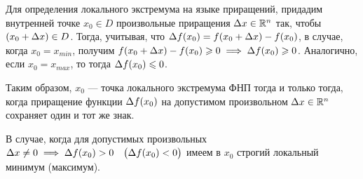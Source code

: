 \documentclass[../../main.tex]{subfiles}
\begin{document}
	Для определения локального экстремума на языке приращений,
	придадим внутренней точке $x_0 \in D$
	произвольные приращения $\Delta x \in \mathbb{R}^n$ так,
	чтобы $(x_0 + \Delta x) \in D$.
	Тогда, учитывая, что $\Delta f (x_0)
	= f (x_0 + \Delta x) - f (x_0)$,
	в случае, когда $x_0 = x_{min}$, получим
	$f (x_0 + \Delta x) - f (x_0) \geqslant 0
	\implies
	\Delta f (x_0) \geqslant 0$.
	Аналогично, если $x_0 = x_{max}$,
	то тогда $\Delta f (x_0) \leqslant 0$.

	Таким образом, $x_0$ --- точка локального экстремума ФНП
	тогда и только тогда, когда
	приращение функции $\Delta f (x_0)$ на допустимом
	произвольном $\Delta x \in \mathbb{R}^n$ сохраняет один и тот же знак.
	
	В случае, когда для допустимых произвольных $\Delta x \ne 0 \implies
	\Delta f (x_0) > 0 \displaystyle
	\quad \big(\Delta f (x_0) < 0\big)$
	имеем в $x_0$ строгий локальный минимум (максимум).
	
\end{document}
